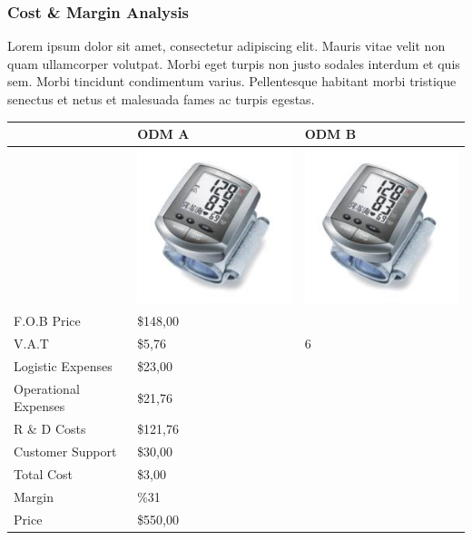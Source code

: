 \documentclass[11pt,titlepage]{article}
\begin{document}
\subsubsection{Cost \& Margin Analysis}
Lorem ipsum dolor sit amet, consectetur adipiscing elit. Mauris vitae velit 
non quam ullamcorper volutpat. Morbi eget turpis non justo sodales interdum 
et quis sem. Morbi tincidunt condimentum varius. Pellentesque habitant morbi 
tristique senectus et netus et malesuada fames ac turpis egestas.\newline
\begin{tabular}{ | l | l | l | }\hline
  & ODM A & ODM B\\\hline
  & \includegraphics[scale=0.40,bb=0 0 150 150]{prod_bpm4.jpg} &
  \includegraphics[scale=0.40,bb=0 0 150 150]{prod_bpm4.jpg}\\\hline
  F.O.B Price & \$148,00 &\\\hline
  V.A.T & \$5,76 & 6\\\hline
  Logistic Expenses & \$23,00 &\\\hline
  Operational Expenses & \$21,76 &\\\hline
  R \& D Costs & \$121,76 &\\\hline
  Customer Support & \$30,00 &\\\hline
  Total Cost & \$3,00 &\\\hline
  Margin & \%31 &\\\hline
  Price & \$550,00 &\\\hline
\end{tabular}
\pagebreak
\end{document}
